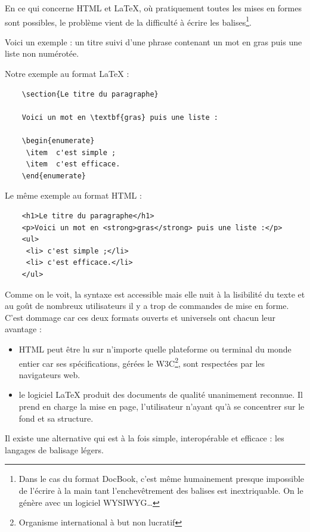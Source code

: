 \documentclass[12pt]{article}
\begin{document}
En ce qui concerne HTML et LaTeX, où pratiquement toutes les mises en
formes sont possibles, le problème vient de la difficulté à écrire les
balises\footnote{Dans le cas du format DocBook, c'est même humainement
  presque impossible de l'écrire à la main tant l'enchevêtrement des
  balises est inextriquable. On le génère avec un logiciel
  WYSIWYG\ldots{}}.

Voici un exemple : un titre suivi d'une phrase contenant un mot en gras
puis une liste non numérotée.

Notre exemple au format LaTeX :

\begin{verbatim}
    \section{Le titre du paragraphe}

    Voici un mot en \textbf{gras} puis une liste :

    \begin{enumerate}
     \item  c'est simple ;
     \item  c'est efficace.
    \end{enumerate}
\end{verbatim}
Le même exemple au format HTML :

\begin{verbatim}
    <h1>Le titre du paragraphe</h1>
    <p>Voici un mot en <strong>gras</strong> puis une liste :</p>
    <ul>
     <li> c'est simple ;</li>
     <li> c'est efficace.</li>
    </ul>
\end{verbatim}
Comme on le voit, la syntaxe est accessible mais elle nuit à la
lisibilité du texte et au goût de nombreux utilisateurs il y a trop de
commandes de mise en forme. C'est dommage car ces deux formats ouverts
et universels ont chacun leur avantage :

\begin{itemize}
\item
  HTML peut être lu sur n'importe quelle plateforme ou terminal du monde
  entier car ses spécifications, gérées le W3C\footnote{Organisme
    international à but non lucratif}, sont respectées par les
  navigateurs web.
\item
  le logiciel LaTeX produit des documents de qualité unanimement
  reconnue. Il prend en charge la mise en page, l'utilisateur n'ayant
  qu'à se concentrer sur le fond et sa structure.
\end{itemize}
Il existe une alternative qui est à la fois simple, interopérable et
efficace : les langages de balisage légers.
\end{document}
